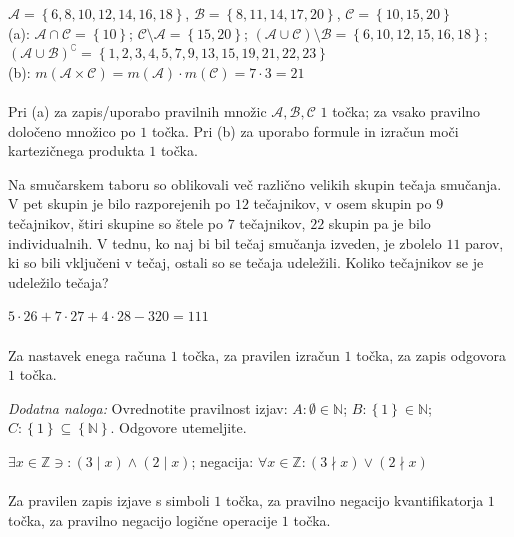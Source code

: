 \documentclass[addpoints]{exam}
\begin{document}
\begin{questions}
    \begin{solution}[13cm]
        $\mathcal{A}=\left\{6,8,10,12,14,16,18\right\}$, $\mathcal{B}=\left\{8,11,14,17,20\right\}$, $\mathcal{C}=\left\{10,15,20\right\}$ \\
        (a): $\mathcal{A}\cap\mathcal{C}=\left\{10\right\}$; $\mathcal{C}\setminus\mathcal{A}=\left\{15,20\right\}$; $(\mathcal{A}\cup\mathcal{C})\setminus\mathcal{B}=\left\{6,10,12,15,16,18\right\}$; $(\mathcal{A}\cup\mathcal{B})^\complement=\left\{1,2,3,4,5,7,9,13,15,19,21,22,23\right\}$ \\
        (b): $m(\mathcal{A}\times\mathcal{C})=m(\mathcal{A})\cdot m(\mathcal{C})=7\cdot 3 = 21$ \\ \\
        Pri (a) za zapis/uporabo pravilnih množic $\mathcal{A}, \mathcal{B}, \mathcal{C}$ $1$ točka; za vsako pravilno določeno množico po $1$ točka. Pri (b) za uporabo formule in izračun moči kartezičnega produkta $1$ točka.
    \end{solution}


        

    \question[3]
    Na smučarskem taboru so oblikovali več različno velikih skupin tečaja smučanja.
    V pet skupin je bilo razporejenih po $12$ tečajnikov, v osem skupin po $9$ tečajnikov, štiri skupine so štele po $7$ tečajnikov, $22$ skupin pa je bilo individualnih.
    V tednu, ko naj bi bil tečaj smučanja izveden, je zbolelo $11$ parov, ki so bili vključeni v tečaj, ostali so se tečaja udeležili.
    Koliko tečajnikov se je udeležilo tečaja?

    \begin{solution}[5cm]
        $5\cdot 26+7\cdot 27+4\cdot 28-320=111$ \\ \\
        Za nastavek enega računa $1$ točka, za pravilen izračun $1$ točka, za zapis odgovora $1$ točka.
    \end{solution}


\newpage

    \vspace{0.1in}

    \bonusquestion[3]
    \textit{Dodatna naloga:} Ovrednotite pravilnost izjav: $A: \emptyset\in\mathbb{N}$; $B:\left\{1\right\}\in\mathbb{N}$; $C: \left\{1\right\}\subseteq\left\{\mathbb{N}\right\}$. Odgovore utemeljite.
    \begin{solution}
        $\exists x\in\mathbb{Z}\ni:(3\mid x)\land(2\mid x)$; negacija: $\forall x\in\mathbb{Z}: (3\nmid x)\lor(2\nmid x)$ \\ \\
        Za pravilen zapis izjave s simboli $1$ točka, za pravilno negacijo kvantifikatorja $1$ točka, za pravilno negacijo logične operacije $1$ točka.
    \end{solution}

\end{questions}
\end{document}
